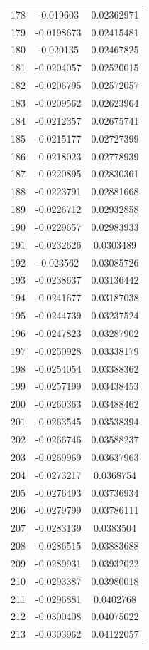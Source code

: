 \documentclass[a4paper, 11pt, oneside]{report}
\begin{document}
{\begin{longtable}{|c|c|c|}
178 & -0.019603  & 0.02362971 \\
179 & -0.0198673 & 0.02415481 \\
180 & -0.020135  & 0.02467825 \\
181 & -0.0204057 & 0.02520015 \\
182 & -0.0206795 & 0.02572057 \\
183 & -0.0209562 & 0.02623964 \\
184 & -0.0212357 & 0.02675741 \\
185 & -0.0215177 & 0.02727399 \\
186 & -0.0218023 & 0.02778939 \\
187 & -0.0220895 & 0.02830361 \\
188 & -0.0223791 & 0.02881668 \\
189 & -0.0226712 & 0.02932858 \\
190 & -0.0229657 & 0.02983933 \\
191 & -0.0232626 & 0.0303489  \\
192 & -0.023562  & 0.03085726 \\
193 & -0.0238637 & 0.03136442 \\
194 & -0.0241677 & 0.03187038 \\
195 & -0.0244739 & 0.03237524 \\
196 & -0.0247823 & 0.03287902 \\
197 & -0.0250928 & 0.03338179 \\
198 & -0.0254054 & 0.03388362 \\
199 & -0.0257199 & 0.03438453 \\
200 & -0.0260363 & 0.03488462 \\
201 & -0.0263545 & 0.03538394 \\
202 & -0.0266746 & 0.03588237 \\
203 & -0.0269969 & 0.03637963 \\
204 & -0.0273217 & 0.0368754  \\
205 & -0.0276493 & 0.03736934 \\
206 & -0.0279799 & 0.03786111 \\
207 & -0.0283139 & 0.0383504  \\
208 & -0.0286515 & 0.03883688 \\
209 & -0.0289931 & 0.03932022 \\
210 & -0.0293387 & 0.03980018 \\
211 & -0.0296881 & 0.0402768  \\
212 & -0.0300408 & 0.04075022 \\
213 & -0.0303962 & 0.04122057 \\

\end{longtable}}
\end{document}

